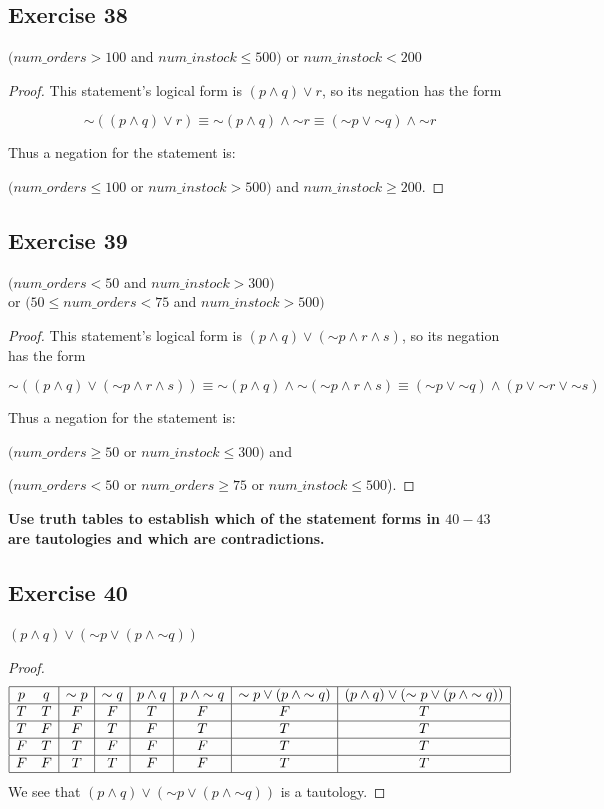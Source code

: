 \documentclass[14pt]{extarticle}
\begin{document}
\subsection{Exercise 38}
$(num\_orders > 100$ and $num\_instock \leq 500)$ or
$num\_instock < 200$

\begin{proof}
This statement’s logical form is $(p \wedge q) \vee r$, so its negation has the form

$$
{\sim((p \wedge q) \vee r)} \equiv {\sim (p \wedge q)} \wedge {\sim r} \equiv ({\sim p} \vee {\sim q}) \wedge {\sim r}
$$

Thus a negation for the statement is:

$(num\_orders \leq 100$ or $num\_instock > 500)$ and $num\_instock \geq 200$.
\end{proof}

\subsection{Exercise 39}
$(num\_orders < 50$ and $num\_instock > 300)$ \\
or $(50 \leq num\_orders < 75$ and $num\_instock > 500)$

\begin{proof}
This statement’s logical form is $(p \wedge q) \vee ({\sim p}
\wedge r \wedge s)$, so its negation has the form

$$
{\sim((p \wedge q) \vee ({\sim p} \wedge r \wedge s))} \equiv {\sim(p \wedge q)} \wedge {\sim({\sim p} \wedge r \wedge s)} \equiv ({\sim p} \vee {\sim q}) \wedge (p \vee {\sim r} \vee {\sim s})
$$

Thus a negation for the statement is:

$(num\_orders \geq 50$ or $num\_instock \leq 300)$ and

($num\_orders < 50$ or $num\_orders \geq 75$ or $num\_instock \leq 500$).
\end{proof}

{\bf Use truth tables to establish which of the statement forms in $40-43$ are tautologies and which are contradictions.}

\subsection{Exercise 40}
$(p \wedge q) \vee ({\sim p} \vee (p \wedge {\sim q}))$

\begin{proof}
$$
\begin{array}{|cc|c|c|c|c|c|c|}
\hline
p & q & {\sim p} & {\sim q} & p \wedge q & p \wedge {\sim q} & {\sim p} \vee (p \wedge {\sim q}) & (p \wedge q) \vee ({\sim p} \vee (p \wedge {\sim q})) \\
\hline
T & T & F & F & T & F & F & T \\
\hline
T & F & F & T & F & T & T & T \\
\hline
F & T & T & F & F & F & T & T \\
\hline
F & F & T & T & F & F & T & T \\
\hline
\end{array}
$$
We see that $(p \wedge q) \vee ({\sim p} \vee (p \wedge {\sim q}))$ is a tautology.
\end{proof}
\end{document}
